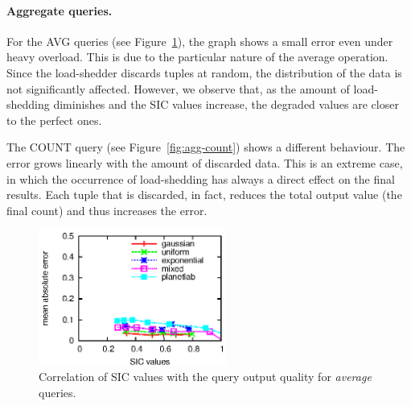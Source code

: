 \paragraph{Aggregate queries.}
For the \textnormal{AVG} queries (see Figure~\ref{fig:agg-avg}), the graph shows a small error even
under heavy overload. This is due to the particular nature of the average operation. Since the
load-shedder discards tuples at random, the distribution of the data is not significantly affected. 
However, we observe that, as the amount of \mbox{load-shedding} diminishes and the SIC values increase,
the degraded values are closer to the perfect ones.

The \textnormal{COUNT} query (see Figure~\ref{fig:agg-count}) shows a different behaviour. The error
grows linearly with the amount of discarded data. This is an extreme case, in which the occurrence of
\mbox{load-shedding} has always a direct effect on the final results. Each tuple that is discarded, in fact,
reduces the total output value (\ie the final count) and thus increases the error.
\vspace{15pt}
\begin{figure}[h!]
\centering
\includegraphics[width=0.55\textwidth]{img/tesi/avg1}
\caption{Correlation of SIC values with the query output quality for \emph{average} queries.}
\label{fig:agg-avg}
\end{figure} 
\clearpage

